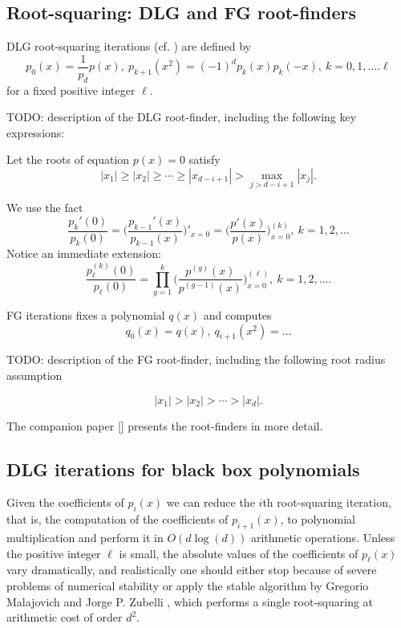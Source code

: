 \documentclass[runningheads]{llncs}
\begin{document}
\subsection{Root-squaring: DLG and FG root-finders}
DLG root-squaring iterations (cf. \cite{10.2307/2310626}) are defined by
\begin{equation}\label{eqdnd}
 p_0(x)=\frac{1}{p_d}p(x),~p_{k+1}(x^2)=(-1)^ d p_k(x)
p_k(-x),~k=0,1,\dots.\ell
\end{equation}
for a fixed positive integer $\ell$.

TODO: description of the DLG root-finder, including the following key expressions:

Let the  roots of equation $p(x)=0$ satisfy
\begin{equation}\label{eqnndcrs} 
 |x_1|\ge|x_2|\ge\cdots\ge |x_{d-i+1}|>\max_{j>d-i+1}|x_j|.
 \end{equation} 

We use the fact
 \begin{equation}\label{eqdndrt0}\frac{p_{k}'(0)}{p_{k}(0)}=\Big(\frac{p_{k-1}'(x)}{p_{k-1}(x)}\Big)'_{x=0}=\Big(\frac{p'(x)}{p(x)}\Big)^{(k)}_{x=0},~k=1,2,\dots
\end{equation}
Notice an immediate extension:
\begin{equation}\label{eqdndrth} \frac{p_{{\ell}}^{(k)}(0)}{p_{\ell}(0)}=\prod_{g=1}^k\Bigg(\frac{p^{(g)}(x)}{p^{(g-1)}(x)}\Bigg)_{x=0}^{(\ell)},~k=1,2,\dots.
\end{equation}

FG iterations fixes a polynomial $q(x)$ and computes
\begin{equation}\label{fg}
q_0(x)=q(x),~q_{i+1}(x^2)= ...
\end{equation}

TODO: description of the FG root-finder, including the following root radius assumption 

\begin{equation}\label{eqsprn}
|x_1|>|x_2|>\cdots>|x_d|.
\end{equation}
 

The companion paper [] presents the root-finders in more detail.

\subsection{DLG iterations for black box polynomials}
Given the coefficients of
$p_i(x)$
we can reduce the $i$th root-squaring iteration, that is, the computation of
the coefficients of  $p_{i+1}(x)$, to polynomial multiplication and perform it in $O(d\log(d))$ arithmetic operations.
Unless the positive integer $\ell$ is small, the absolute values of the coefficients
of $p_{\ell}(x)$ vary  dramatically, and realistically one should either stop because of severe problems of numerical stability or apply the stable algorithm by Gregorio Malajovich and Jorge  P. Zubelli \cite{Malajovich2001OnTG}, which performs a single root-squaring at  arithmetic cost of order $d^2$.
\end{document}
